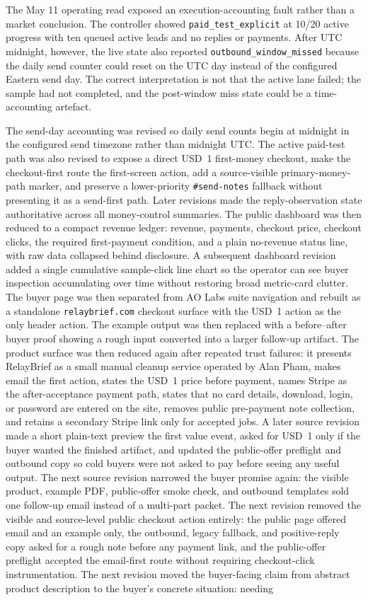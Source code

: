 \documentclass[12pt,letterpaper]{article}
\begin{document}
The May 11 operating read exposed an execution-accounting fault rather than a market conclusion. The controller showed \texttt{paid\_test\_explicit} at 10/20 active progress with ten queued active leads and no replies or payments. After UTC midnight, however, the live state also reported \texttt{outbound\_window\_missed} because the daily send counter could reset on the UTC day instead of the configured Eastern send day. The correct interpretation is not that the active lane failed; the sample had not completed, and the post-window miss state could be a time-accounting artefact.

The send-day accounting was revised so daily send counts begin at midnight in the configured send timezone rather than midnight UTC. The active paid-test path was also revised to expose a direct USD~1 first-money checkout, make the checkout-first route the first-screen action, add a source-visible primary-money-path marker, and preserve a lower-priority \texttt{\#send-notes} fallback without presenting it as a send-first path. Later revisions made the reply-observation state authoritative across all money-control summaries. The public dashboard was then reduced to a compact revenue ledger: revenue, payments, checkout price, checkout clicks, the required first-payment condition, and a plain no-revenue status line, with raw data collapsed behind disclosure. A subsequent dashboard revision added a single cumulative sample-click line chart so the operator can see buyer inspection accumulating over time without restoring broad metric-card clutter. The buyer page was then separated from AO Labs suite navigation and rebuilt as a standalone \texttt{relaybrief.com} checkout surface with the USD~1 action as the only header action. The example output was then replaced with a before--after buyer proof showing a rough input converted into a larger follow-up artifact. The product surface was then reduced again after repeated trust failures: it presents RelayBrief as a small manual cleanup service operated by Alan Pham, makes email the first action, states the USD~1 price before payment, names Stripe as the after-acceptance payment path, states that no card details, download, login, or password are entered on the site, removes public pre-payment note collection, and retains a secondary Stripe link only for accepted jobs. A later source revision made a short plain-text preview the first value event, asked for USD~1 only if the buyer wanted the finished artifact, and updated the public-offer preflight and outbound copy so cold buyers were not asked to pay before seeing any useful output. The next source revision narrowed the buyer promise again: the visible product, example PDF, public-offer smoke check, and outbound templates sold one follow-up email instead of a multi-part packet. The next revision removed the visible and source-level public checkout action entirely: the public page offered email and an example only, the outbound, legacy fallback, and positive-reply copy asked for a rough note before any payment link, and the public-offer preflight accepted the email-first route without requiring checkout-click instrumentation. The next revision moved the buyer-facing claim from abstract product description to the buyer's concrete situation: needing 
\end{document}
